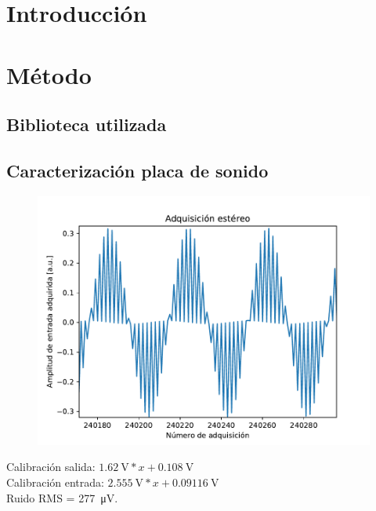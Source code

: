 \documentclass[a4paper,11pt]{article}
\begin{document}
\section{Introducción}

\section{Método}

	\subsection{Biblioteca utilizada}
	
	\subsection{Caracterización placa de sonido}
	
	\begin{figure}[h]
		\centering
		\includegraphics[width=\textwidth]{imagenes/estereo.pdf}
		\caption{}
	\end{figure}
	
	
	Calibración salida: $\SI{1.62}{\V} * x + \SI{0.108}{\V}$\\
	Calibración entrada: $\SI{2.555}{\V} * x + \SI{0.09116}{\V}$\\
	
	Ruido RMS = \SI{277}{\uV}.
	
\end{document}
